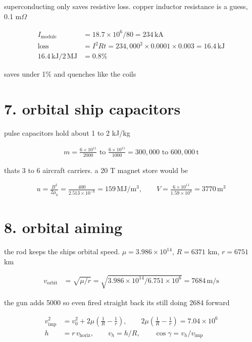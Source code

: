 \documentclass[11pt]{article}
\newcommand{\un}[1]{\,\mathrm{#1}}
\begin{document}
superconducting only saves resistive loss. copper inductor resistance is a guess, 0.1 m$\Omega$

\begin{align*}
I_{\text{module}} &= 18.7\times10^6/80 = 234\un{kA}\\
\text{loss} &= I^2 R t = 234{,}000^2 \times 0.0001 \times 0.003 = 16.4\un{kJ}\\
16.4\un{kJ}/2\un{MJ} &= 0.8\%
\end{align*}

saves under 1\% and quenches like the coils

\section*{7. orbital ship capacitors}

pulse capacitors hold about 1 to 2 kJ/kg

\begin{align*}
m = \frac{6\times10^{11}}{2000} \text{ to } \frac{6\times10^{11}}{1000} = 300{,}000 \text{ to } 600{,}000\un{t}
\end{align*}

thats 3 to 6 aircraft carriers. a 20 T magnet store would be

\begin{align*}
u = \frac{B^2}{2\mu_0} = \frac{400}{2.513\times10^{-6}} = 159\un{MJ/m^3}, \qquad V = \frac{6\times10^{11}}{1.59\times10^8} = 3770\un{m^3}
\end{align*}

\section*{8. orbital aiming}

the rod keeps the ships orbital speed. $\mu = 3.986\times10^{14}$, $R = 6371$ km, $r = 6751$ km

\begin{align*}
v_{\text{orbit}} &= \sqrt{\mu/r} = \sqrt{3.986\times10^{14}/6.751\times10^6} = 7684\un{m/s}
\end{align*}

the gun adds 5000 so even fired straight back its still doing 2684 forward

\begin{align*}
v_{\text{imp}}^2 &= v_0^2 + 2\mu\left(\tfrac1R - \tfrac1r\right), \qquad 2\mu\left(\tfrac1R - \tfrac1r\right) = 7.04\times10^6\\
h &= r\, v_{\text{horiz}}, \qquad v_h = h/R, \qquad \cos\gamma = v_h / v_{\text{imp}}
\end{align*}
\end{document}
